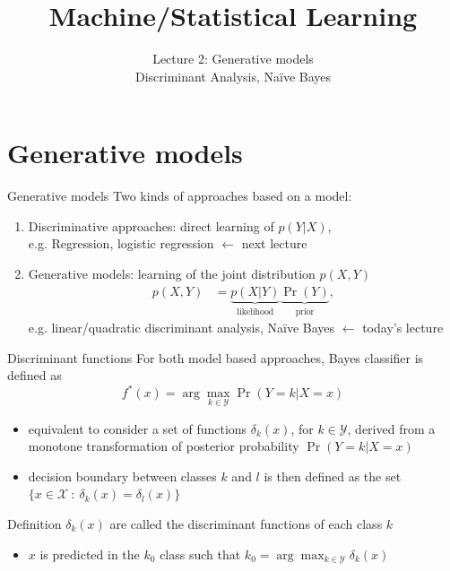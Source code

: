 \documentclass[compress, smaller, serif, 9pt]{beamer}
\title[Statistical Learning]{Machine/Statistical Learning}
\subtitle{Lecture 2: Generative models\\
Discriminant Analysis, Naïve Bayes}
\institute{Filière SICOM, 3A}
\date{}
\newcommand{\structuretext}[1]{{\usebeamercolor[fg]{structure} #1}}
\newcommand{\doigt}{\structuretext{\noindent \Pisymbol{pzd}{43}}}
\begin{document}
\maketitle


\section{Generative models}

\begin{frame}{Generative models}
Two kinds of approaches based on a model:
\begin{enumerate}
 \item Discriminative approaches: direct learning  of $p{(Y|X)}$,\\
 e.g. Regression, logistic regression $\leftarrow$ next lecture
 \item Generative models: learning of the joint distribution $p(X,Y)$
 \begin{align*}
  p(X,Y) &= \underbrace{p(X|Y)}_{\textrm{likelihood}} \underbrace{\Pr{(Y)}}_{\textrm{prior}},
 \end{align*}
e.g. linear/quadratic discriminant analysis, Naïve Bayes \structuretext{$\leftarrow$ today's lecture }
\end{enumerate}

\end{frame}

\begin{frame}{Discriminant functions}
For both model based approaches, Bayes classifier is defined as
$$f^{\ast}(x)= \arg \max_{k \in\mathcal{Y}  } \Pr( Y= k | X=x)$$
\begin{itemize}
 \item equivalent to consider a set of functions $\delta_k(x)$, for $k \in\mathcal{Y}$, derived from a monotone transformation of
 posterior probability $\Pr{(Y=k |X=x)}$
 \item decision boundary  between classes $k$ and $l$ is then defined as the set $\{x \in \mathcal{X}\ : \ \delta_k(x)= \delta_l(x) \}$
\end{itemize}

\begin{block}{Definition}
 $\delta_k(x)$ are called the \structuretext{discriminant functions} of each class $k$
 \begin{itemize}
  \item[\doigt] $x$ is predicted in the $k_0$ class such that  $k_0= \arg \max_{k \in\mathcal{Y} } \delta_k(x) $
 \end{itemize}
\end{block}

\end{frame}
\end{document}
